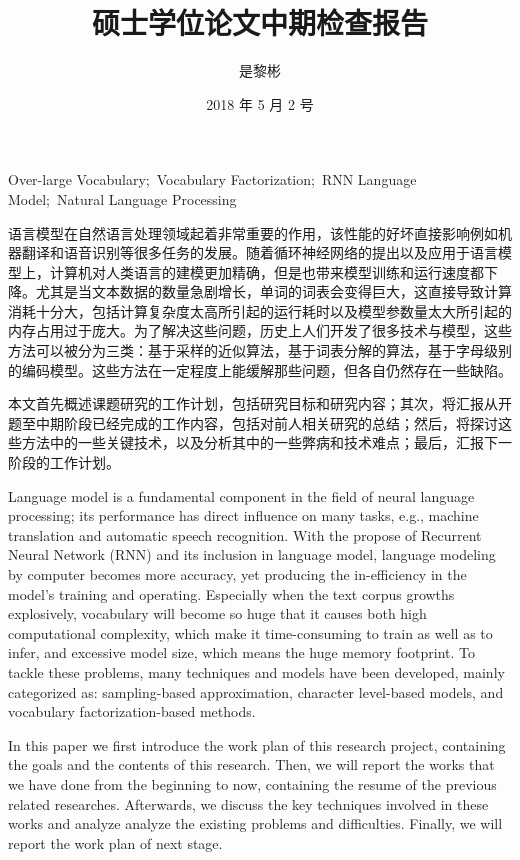 \documentclass[12pt,a4paper]{article}
\title{硕士学位论文中期检查报告}
\author{是黎彬}
\date{2018 年 5 月 2 号}
\begin{document}
\maketitle



{Over-large Vocabulary;\ Vocabulary Factorization;\ RNN Language Model;\ Natural Language Processing}

\begin{abstract_ch}
语言模型在自然语言处理领域起着非常重要的作用，该性能的好坏直接影响例如机器翻译和语音识别等很多任务的发展。随着循环神经网络的提出以及应用于语言模型上，计算机对人类语言的建模更加精确，但是也带来模型训练和运行速度都下降。尤其是当文本数据的数量急剧增长，单词的词表会变得巨大，这直接导致计算消耗十分大，包括计算复杂度太高所引起的运行耗时以及模型参数量太大所引起的内存占用过于庞大。为了解决这些问题，历史上人们开发了很多技术与模型，这些方法可以被分为三类：基于采样的近似算法，基于词表分解的算法，基于字母级别的编码模型。这些方法在一定程度上能缓解那些问题，但各自仍然存在一些缺陷。

本文首先概述课题研究的工作计划，包括研究目标和研究内容；其次，将汇报从开题至中期阶段已经完成的工作内容，包括对前人相关研究的总结；然后，将探讨这些方法中的一些关键技术，以及分析其中的一些弊病和技术难点；最后，汇报下一阶段的工作计划。

\end{abstract_ch}
\newpage
\begin{abstract_en}
Language model is a fundamental component in the field of neural language processing; its performance has direct influence on many tasks, e.g., machine translation and automatic speech recognition. With the propose of Recurrent Neural Network (RNN) and its inclusion in language model, language modeling by computer becomes more accuracy, yet producing the in-efficiency in the model’s training and operating. Especially when the text corpus growths explosively, vocabulary will become so huge that it causes both high computational complexity, which make it time-consuming to train as well as to infer, and excessive model size, which means the huge memory footprint. To tackle these problems, many techniques and models have been developed, mainly categorized as: sampling-based approximation, character level-based models, and vocabulary factorization-based methods.

In this paper we first introduce the work plan of this research project, containing the goals and the contents of this research. Then, we will report the works that we have done from the beginning to now, containing the resume of the previous related researches. Afterwards, we discuss the key techniques involved in these works and analyze analyze the existing problems and difficulties. Finally, we will report the work plan of next stage.


\end{abstract_en}
\newpage
\tableofcontents
\newpage
\end{document}
